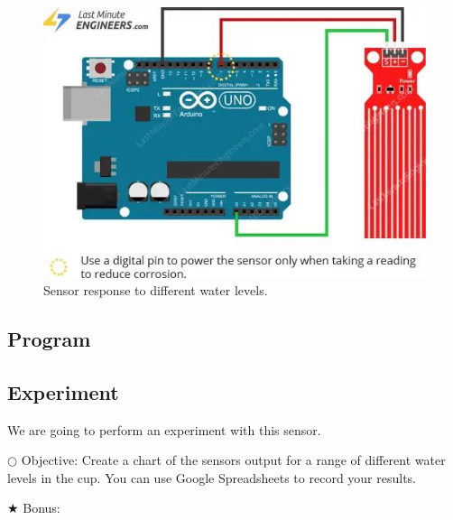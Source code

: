 \documentclass[12pt]{article}
\begin{document}
\begin{figure}[H]
	\begin{center}
		\includegraphics[scale=0.55]{circuit_water_sensor_basic}
		\caption{Sensor response to different water levels.}
		\label{circuit:water_sensor_basic}
	\end{center}
\end{figure}














\subsection{Program}











\subsection{Experiment}

We are going to perform an experiment with this sensor. 


\noindent $\bigcirc$ Objective: Create a chart of the sensors output for a range of different water levels in the cup. You can use Google Spreadsheets to record your results.

\noindent $\bigstar$ Bonus: 
\end{document}
